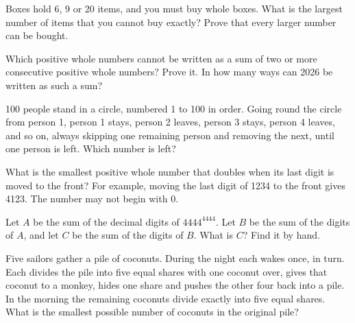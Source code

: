 \begin{question}\label{iq:iv1:number-riddles:20}
Boxes hold 6, 9 or 20 items, and you must buy whole boxes. What is the largest number of items that you cannot buy exactly? Prove that every larger number can be bought.
\end{question}

\begin{question}\label{iq:iv1:number-riddles:21}
Which positive whole numbers cannot be written as a sum of two or more consecutive positive whole numbers? Prove it. In how many ways can 2026 be written as such a sum?
\end{question}

\begin{question}\label{iq:iv1:number-riddles:22}
100 people stand in a circle, numbered 1 to 100 in order. Going round the circle from person 1, person 1 stays, person 2 leaves, person 3 stays, person 4 leaves, and so on, always skipping one remaining person and removing the next, until one person is left. Which number is left?
\end{question}

\begin{question}\label{iq:iv1:number-riddles:23}
What is the smallest positive whole number that doubles when its last digit is moved to the front? For example, moving the last digit of 1234 to the front gives 4123. The number may not begin with 0.
\end{question}

\begin{question}\label{iq:iv1:number-riddles:24}
Let $A$ be the sum of the decimal digits of $4444^{4444}$. Let $B$ be the sum of the digits of $A$, and let $C$ be the sum of the digits of $B$. What is $C$? Find it by hand.
\end{question}

\begin{question}\label{iq:iv1:number-riddles:25}
Five sailors gather a pile of coconuts. During the night each wakes once, in turn. Each divides the pile into five equal shares with one coconut over, gives that coconut to a monkey, hides one share and pushes the other four back into a pile. In the morning the remaining coconuts divide exactly into five equal shares. What is the smallest possible number of coconuts in the original pile?
\end{question}
